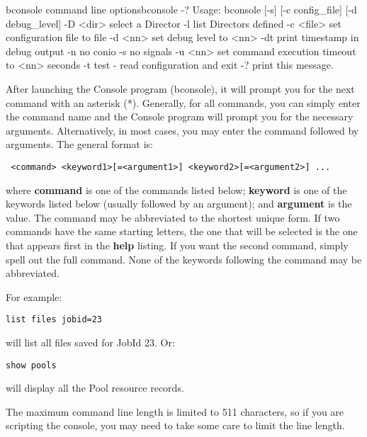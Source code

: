 \begin{commandOut}{bconsole command line options}{}{bconsole -?}
Usage: bconsole [-s] [-c config_file] [-d debug_level]
       -D <dir>    select a Director
       -l          list Directors defined
       -c <file>   set configuration file to file
       -d <nn>     set debug level to <nn>
       -dt         print timestamp in debug output
       -n          no conio
       -s          no signals
       -u <nn>     set command execution timeout to <nn> seconds
       -t          test - read configuration and exit
       -?          print this message.
\end{commandOut}


After launching the Console program (bconsole), it will prompt you for the next
command with an asterisk (*).  Generally, for all commands, you can simply
enter the command name and the Console program will prompt you for the
necessary arguments. Alternatively, in most cases, you may enter the command
followed by arguments. The general format is:

\footnotesize
\begin{verbatim}
 <command> <keyword1>[=<argument1>] <keyword2>[=<argument2>] ...
\end{verbatim}
\normalsize

where {\bf command} is one of the commands listed below; {\bf keyword} is one
of the keywords listed below (usually followed by an argument); and {\bf
argument} is the value. The command may be abbreviated to the shortest unique
form. If two commands have the same starting letters, the one that will be
selected is the one that appears first in the {\bf help} listing. If you want
the second command, simply spell out the full command. None of the keywords
following the command may be abbreviated.

For example:

\footnotesize
\begin{verbatim}
list files jobid=23
\end{verbatim}
\normalsize

will list all files saved for JobId 23. Or:

\footnotesize
\begin{verbatim}
show pools
\end{verbatim}
\normalsize

will display all the Pool resource records.

The maximum command line length is limited to 511 characters, so if you
are scripting the console, you may need to take some care to limit the
line length.

